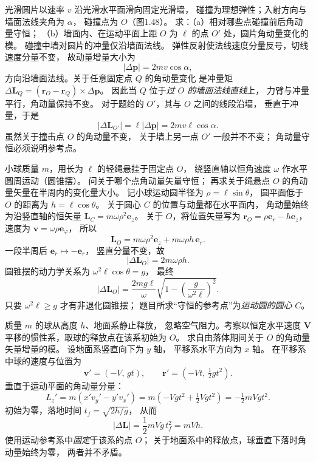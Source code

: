 光滑圆片以速率 $v$ 沿光滑水平面滑向固定光滑墙，
碰撞为理想弹性；入射方向与墙面法线夹角为 $\alpha$，
碰撞点为 $O$（图1.48）。
求：（a）相对哪些点碰撞前后角动量守恒；
（b）墙面内、在运动平面上距 $O$ 为 $\ell$ 的点 $O'$
处，圆片角动量变化的模。
\exsolution
碰撞中墙对圆片的冲量仅沿墙面法线。
弹性反射使法线速度分量反号，切线速度分量不变，
故动量增量大小为
\[
|\Delta\bm p|=2mv\cos\alpha,
\]
方向沿墙面法线。关于任意固定点 $Q$ 的角动量变化
是冲量矩
$\Delta\bm L_Q=(\bm r_O-\bm r_Q)\times\Delta\bm p$。
因此当 $Q$ 位于\emph{过 $O$ 的墙面法线直线}上，
力臂与冲量平行，角动量保持不变。
对于题给的 $O'$，其与 $O$ 之间的线段沿墙，
垂直于冲量，于是
\[
\boxed{|\Delta\bm L_{O'}|
=\ell|\Delta\bm p|=2mv\ell\cos\alpha}.
\]
\excheck 虽然关于撞击点 $O$ 的角动量不变，
关于墙上另一点 $O'$ 一般并不不变；
角动量守恒必须说明参考点。

小球质量 $m$，用长为 $\ell$ 的轻绳悬挂于固定点 $O$，
绕竖直轴以恒角速度 $\omega$ 作水平圆周运动（圆锥摆）。
问关于哪个点角动量矢量守恒；
再求关于绳悬点 $O$ 的角动量矢量在半周内的变化量大小。
\exsolution
记小球运动圆半径为 $\rho=\ell\sin\theta$，
圆平面低于 $O$ 的距离为 $h=\ell\cos\theta$。
关于圆心 $C$ 的位置与动量都在水平面内，
角动量始终为沿竖直轴的恒矢量
$\bm L_C=m\omega\rho^2\bm e_z$。
关于 $O$，将位置矢量写为
$\bm r_{O}=\rho\bm e_r-h\bm e_z$，速度为
$\bm v=\omega\rho\bm e_\varphi$，
所以
\[
\bm L_O
=m\omega\rho^2\bm e_z+
m\omega\rho h\,\bm e_r .
\]
一段半周后 $\bm e_r\mapsto-\bm e_r$，
竖直分量不变，故
\[
|\Delta\bm L_O|=2m\omega\rho h.
\]
圆锥摆的动力学关系为
$\omega^2\ell\cos\theta=g$，
最终
\[
\boxed{|\Delta\bm L_O|
=\frac{2mg\ell}{\omega}
\sqrt{1-\left(\frac g{\omega^2\ell}\right)^2}}.
\]
\excheck 只要 $\omega^2\ell\ge g$ 才有非退化圆锥摆；
题目所求“守恒的参考点”为\emph{运动圆的圆心} $C$。

质量 $m$ 的球从高度 $h$、地面系静止释放，
忽略空气阻力。考察以恒定水平速度
$\bm V$ 平移的惯性系，取球的释放点在该系初始为 $O$。
求自由落体期间关于 $O$ 的角动量矢量增量的模。
\exsolution
设地面系竖直向下为 $y$ 轴，
平移系水平方向为 $x$ 轴。
在平移系中球的速度与位置为
\[
\bm v'=(-V,\,gt),\qquad
\bm r'=(-Vt,\,\tfrac12gt^2).
\]
垂直于运动平面的角动量分量：
\[
L_z'=m(x'v_y'-y'v_x')
=m(-Vgt^2+\tfrac12Vgt^2)
=-\tfrac12mVgt^2.
\]
初始为零，落地时间 $t_f=\sqrt{2h/g}$，
从而
\[
\boxed{|\Delta\bm L|=\frac12mVg\,t_f^2=mVh}.
\]
\excheck 使用运动参考系中\emph{固定}于该系的点 $O$；
关于地面系中的释放点，球垂直下落时角动量始终为零，
两者并不矛盾。

